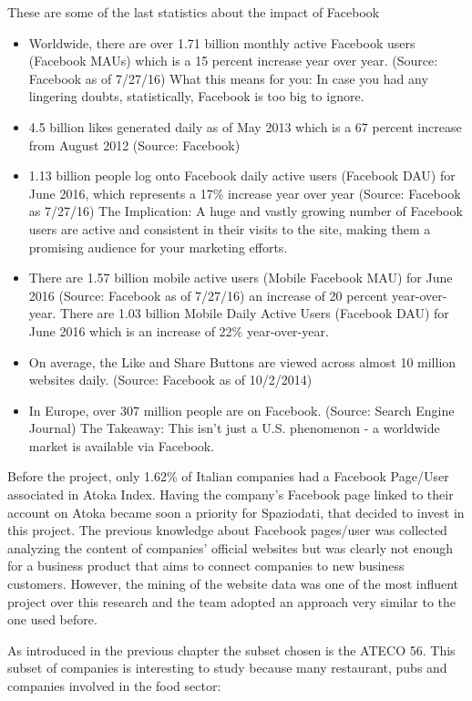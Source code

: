 These are some of the last statistics about the impact of Facebook\cite{fbstats}
\begin{itemize}
\item Worldwide, there are over 1.71 billion monthly active Facebook users (Facebook MAUs) which is a 15 percent increase year over year. (Source: Facebook as of 7/27/16) What this means for you: In case you had any lingering doubts, statistically, Facebook is too big to ignore.
\item 4.5 billion likes generated daily as of May 2013 which is a 67 percent increase from August 2012 (Source: Facebook)
\item 1.13 billion people log onto Facebook daily active users (Facebook DAU) for June 2016, which represents a 17\% increase year over year (Source: Facebook as 7/27/16) The Implication: A huge and vastly growing number of Facebook users are active and consistent in their visits to the site, making them a promising audience for your marketing efforts.
\item There are 1.57 billion mobile active users (Mobile Facebook MAU) for June 2016 (Source: Facebook as of 7/27/16) an increase of 20 percent year-over-year.  There are 1.03 billion Mobile Daily Active Users (Facebook DAU) for June 2016 which is an increase of 22\% year-over-year.
\item On average, the Like and Share Buttons are viewed across almost 10 million websites daily. (Source: Facebook as of 10/2/2014)
\item In Europe, over 307 million people are on Facebook. (Source: Search Engine Journal) The Takeaway: This isn't just a U.S. phenomenon - a worldwide market is available via Facebook.
\end{itemize}

Before the project, only 1.62\% of Italian companies had a Facebook Page/User associated in Atoka Index.
Having the company's Facebook page linked to their account on Atoka became soon a priority for Spaziodati, that decided to invest in this project. The previous knowledge about Facebook pages/user was collected analyzing the content of companies' official websites but was clearly not enough for a business product that aims to connect companies to new business customers. However, the mining of the website data was one of the most influent project over this research and the team adopted an approach very similar to the one used before.

As introduced in the previous chapter the subset chosen is the ATECO 56. This subset of companies is interesting to study because many restaurant, pubs and companies involved in the food sector:

